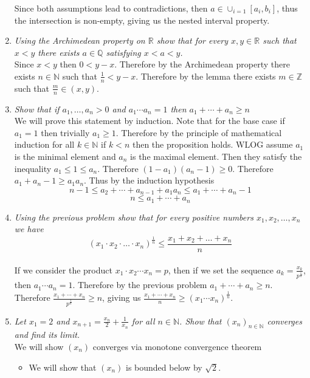 \documentclass[12pt, letterpaper]{article}
\newcommand{\Z}{\mathbb{Z}}
\newcommand{\N}{\mathbb{N}}
\newcommand{\R}{\mathbb{R}}
\newcommand{\Q}{\mathbb{Q}}
\begin{document}
\begin{enumerate}
	Since both assumptions lead to contradictions, then $a \in \cup_{i=1} [a_i,b_i]$, thus the intersection is non-empty, giving us the nested interval property.  
	\fi
	
	\item \textit{Using the Archimedean property on $\R$ show that for every $x, y \in \R$ such that $x < y$ there exists
$a \in \Q$ satisfying $x < a < y$.}\\
	Since $x < y$ then $0 < y - x$.  Therefore by the Archimedean property there exists $n \in \N$ such that $\frac{1}{n} < y -x$.  Therefore by the lemma there exists $m \in \Z$ such that $\frac{m}{n} \in (x,y)$.  
	\item \textit{Show that if $a_1,\ldots,a_n > 0$ and $a_1\cdots a_n = 1$ then $a_1 + \cdots + a_n \geq n$}\\
	We will prove this statement by induction.  Note that for the base case 
	if $a_1 = 1$ then trivially $a_1 \geq 1$.  Therefore by the principle of 
	mathematical induction for all $k \in \N$ if $k < n$ then the proposition holds.  
	WLOG assume $a_1$ is the minimal element and $a_n$ is the maximal element.  
	Then they satisfy the inequality $a_1 \leq 1 \leq a_n$.  Therefore $(1-a_1)(a_n-1)\geq 0$.  Therefore $a_1 + a_n - 1\geq a_1 a_n $.  Thus by the induction hypothesis 
	$$
	n - 1 \leq a_2 + \cdots + a_{n-1} + a_1 a_n \leq a_1 + \cdots + a_n - 1
	$$
	$$
	n \leq a_1 + \cdots + a_n
	$$
	\item \textit{Using the previous problem show that for every positive numbers $x_1, x_2, \ldots , x_n$ we have
	$$ (x_1\cdot x_2 \cdot \ldots \cdot x_n)^{\frac{1}{n}} \leq \frac{x_1 + x_2 + \ldots + x_n}{n}$$	}\\
	If we consider the product $x_1\cdot x_2 \cdots x_n = p$, then if we 
	set the sequence $a_k = \frac{x_k}{p^{\frac{1}{n}}}$, then $a_1\cdots a_n = 1$.  Therefore by the previous problem $a_1 + \cdots + a_n \geq n$.
	Therefore $\frac{x_1 + \cdots + x_n}{p^{\frac{1}{n}}} \geq n$, giving us
	$\frac{x_1 + \cdots + x_n}{n} \geq (x_1\cdots x_n)^{\frac{1}{n}}$.  
	\item \textit{Let $x_1 = 2$ and $x_{n+1} = \frac{x_n}{2} + 
\frac{1}{x_n}$ for all $n \in \N$. Show that $(x_n)_{n\in\N}$ converges and find its limit.}\\
	 We will show $(x_n)$ converges via monotone convergence theorem\\
	 \begin{itemize}
	 	\item We will show that $(x_n)$ is bounded below by $\sqrt{2}$.  

\end{itemize}
\end{enumerate}
\end{document}
